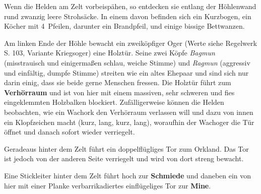 
Wenn die Helden am Zelt vorbeispähen, so entdecken sie entlang der Höhlenwand rund zwanzig leere Strohsäcke. In einem davon befinden sich ein Kurzbogen, ein Köcher mit 4~Pfeilen, darunter ein Brandpfeil, und einige bissige Bettwanzen.

Am linken Ende der Höhle bewacht ein zweiköpfiger Oger (Werte siehe Regelwerk S. 103, Variante Kriegsoger) eine Holztür.
Seine zwei Köpfe \textit{Bagmun} (misstrauisch und einigermaßen schlau, weiche Stimme) und \textit{Ragmun} (aggressiv und einfältig, dumpfe Stimme) streiten wie ein altes Ehepaar und sind sich nur darin einig, dass sie beide gerne Menschen fressen.
Die Holztür führt zum \textbf{Verhörraum} und ist von hier mit einem massiven, sehr schweren und fies eingeklemmten Holzbalken blockiert.
Zufälligerweise können die Helden beobachten, wie ein Wachork den Verhörraum verlassen will und dazu von innen ein Klopfzeichen macht (kurz, lang, kurz, lang), woraufhin der Wachoger die Tür öffnet und danach sofort wieder verriegelt.


Geradeaus hinter dem Zelt führt ein doppelflügliges Tor zum Orkland.
Das Tor ist jedoch von der anderen Seite verriegelt und wird von dort streng bewacht.

Eine Stickleiter hinter dem Zelt führt hoch zur \textbf{Schmiede} und daneben ein von hier mit einer Planke verbarrikadiertes einflügeliges Tor zur \textbf{Mine}.



